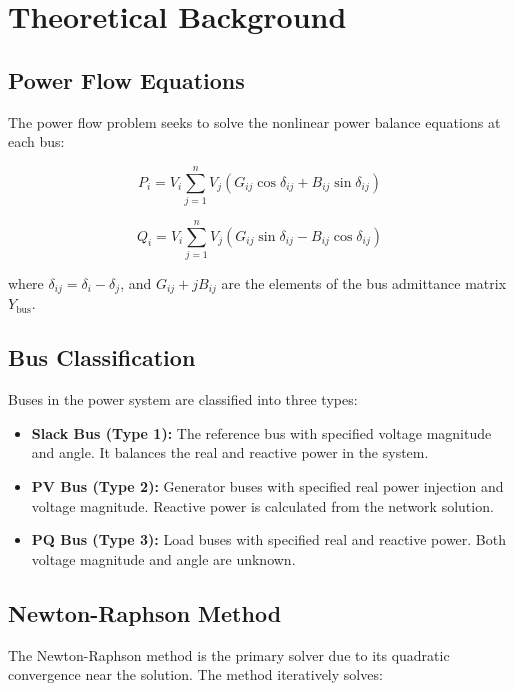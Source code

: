 \documentclass[12pt,a4paper]{article}
\begin{document}
\section{Theoretical Background}

\subsection{Power Flow Equations}

The power flow problem seeks to solve the nonlinear power balance equations at each bus:

\begin{equation}
P_i = V_i \sum_{j=1}^{n} V_j \left( G_{ij} \cos \delta_{ij} + B_{ij} \sin \delta_{ij} \right)
\end{equation}

\begin{equation}
Q_i = V_i \sum_{j=1}^{n} V_j \left( G_{ij} \sin \delta_{ij} - B_{ij} \cos \delta_{ij} \right)
\end{equation}

where $\delta_{ij} = \delta_i - \delta_j$, and $G_{ij} + jB_{ij}$ are the elements of the bus admittance matrix $Y_{\text{bus}}$.

\subsection{Bus Classification}

Buses in the power system are classified into three types:

\begin{itemize}
    \item \textbf{Slack Bus (Type 1):} The reference bus with specified voltage magnitude and angle. It balances the real and reactive power in the system.
    \item \textbf{PV Bus (Type 2):} Generator buses with specified real power injection and voltage magnitude. Reactive power is calculated from the network solution.
    \item \textbf{PQ Bus (Type 3):} Load buses with specified real and reactive power. Both voltage magnitude and angle are unknown.
\end{itemize}

\subsection{Newton-Raphson Method}

The Newton-Raphson method is the primary solver due to its quadratic convergence near the solution. The method iteratively solves:
\end{document}
